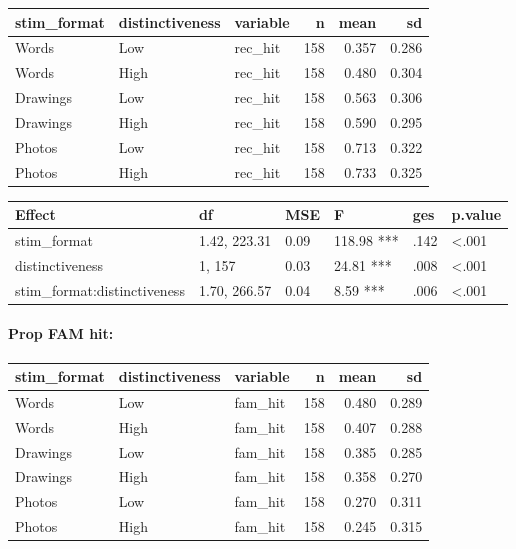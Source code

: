 \documentclass[
  11pt,
]{article}
\begin{document}
\begin{table}[!h]
\centering
\begin{tabular}{lllrrr}
\toprule
stim\_format & distinctiveness & variable & n & mean & sd\\
\midrule
Words & Low & rec\_hit & 158 & 0.357 & 0.286\\
Words & High & rec\_hit & 158 & 0.480 & 0.304\\
Drawings & Low & rec\_hit & 158 & 0.563 & 0.306\\
Drawings & High & rec\_hit & 158 & 0.590 & 0.295\\
Photos & Low & rec\_hit & 158 & 0.713 & 0.322\\
\addlinespace
Photos & High & rec\_hit & 158 & 0.733 & 0.325\\
\bottomrule
\end{tabular}
\end{table}

\begin{tabular}{l|l|l|l|l|l}
\hline
Effect & df & MSE & F & ges & p.value\\
\hline
stim\_format & 1.42, 223.31 & 0.09 & 118.98 *** & .142 & <.001\\
\hline
distinctiveness & 1, 157 & 0.03 & 24.81 *** & .008 & <.001\\
\hline
stim\_format:distinctiveness & 1.70, 266.57 & 0.04 & 8.59 *** & .006 & <.001\\
\hline
\end{tabular}

\newpage

\hypertarget{prop-fam-hit}{%
\paragraph{Prop FAM hit:}\label{prop-fam-hit}}

\begin{table}[!h]
\centering
\begin{tabular}{lllrrr}
\toprule
stim\_format & distinctiveness & variable & n & mean & sd\\
\midrule
Words & Low & fam\_hit & 158 & 0.480 & 0.289\\
Words & High & fam\_hit & 158 & 0.407 & 0.288\\
Drawings & Low & fam\_hit & 158 & 0.385 & 0.285\\
Drawings & High & fam\_hit & 158 & 0.358 & 0.270\\
Photos & Low & fam\_hit & 158 & 0.270 & 0.311\\
\addlinespace
Photos & High & fam\_hit & 158 & 0.245 & 0.315\\
\bottomrule
\end{tabular}
\end{table}
\end{document}
